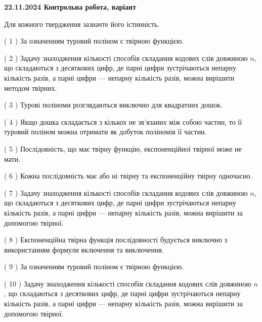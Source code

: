 \documentclass[12pt, ukrainian]{article}
\begin{document}
\vspace{4mm}
\newpage
\begin {large}

\textbf{22.11.2024 Контрольна робота, варіант  }\par


{
Для кожного твердження зазначте його істинність.\par
\vspace{2mm}
( 1 ) За означенням туровий поліном є твірною функцією.%

( 2 ) Задачу знаходження кількості способів складання кодових слів довжиною $n$, що складаються з десяткових цифр, де парні цифри зустрічаються непарну кількість разів, а парні цифри — непарну кількість разів, можна вирішити методом твірних.%

( 3 ) Турові поліноми розглядаються виключно для квадратних дошок.%

( 4 ) Якщо дошка складається з кількох не зв’язаних між собою частин, то її туровий поліном можна отримати як добуток поліномів її частин.%

( 5 ) Послідовність, що має твірну функцію, експоненційної твірної може не мати.%

( 6 ) Кожна послідовність має або ні твірну та експоненційну твірну одночасно.%

( 7 ) Задачу знаходження кількості способів складання кодових слів довжиною $n$, що складаються з десяткових цифр, де парні цифри зустрічаються непарну кількість разів, а парні цифри — непарну кількість разів, можна вирішити за допомогою твірної.%

( 8 ) Експоненційна твірна функція послідовності будується виключно з використанням формули включення та виключення.%

( 9 ) За означенням туровий поліном є твірною функцією.%

( 10 ) Задачу знаходження кількості способів складання кодових слів довжиною $n$, що складаються з десяткових цифр, де парні цифри зустрічаються непарну кількість разів, а парні цифри — непарну кількість разів, можна вирішити за допомогою твірної.%


\vspace{5mm}
}
\end {large}
\end{document}

